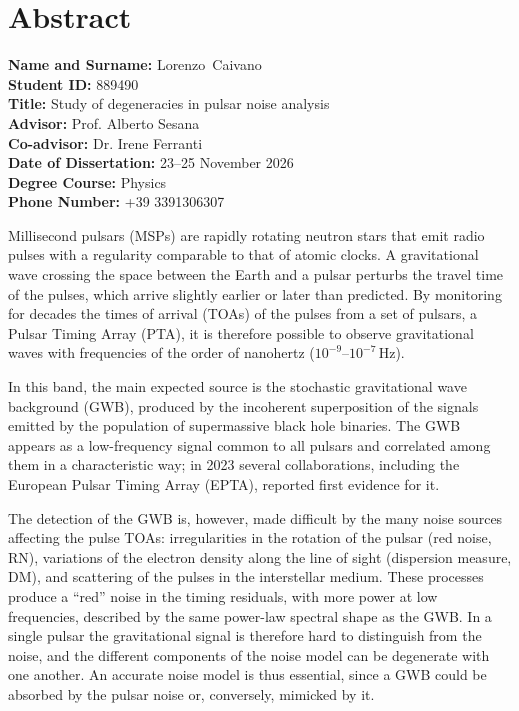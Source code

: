 \documentclass[12pt]{report}
\newcommand{\surnameEN}{Caivano}
\newcommand{\nameEN}{Lorenzo}
\newcommand{\matricolaEN}{889490}
\newcommand{\thesisTitleEN}{Study of degeneracies in pulsar noise analysis}
\newcommand{\advisorEN}{Prof. Alberto Sesana}
\newcommand{\coadvisorEN}{Dr. Irene Ferranti}
\newcommand{\defenseDateEN}{23--25 November 2026}
\newcommand{\degreeCourseEN}{Physics}
\newcommand{\phoneEN}{+39 3391306307}
\begin{document}
\newpage
\chapter*{Abstract}
\begin{center}
\textbf{Name and Surname:} \nameEN \, \surnameEN \\[0.3cm]
\textbf{Student ID:} \matricolaEN \\[0.3cm]
\textbf{Title:} \thesisTitleEN \\[0.3cm]
\textbf{Advisor:} \advisorEN \\[0.3cm]
\textbf{Co-advisor:} \coadvisorEN \\[0.3cm]
\textbf{Date of Dissertation:} \defenseDateEN \\[0.3cm]
\textbf{Degree Course:} \degreeCourseEN \\[0.3cm]
\textbf{Phone Number:} \phoneEN \\
\vspace{1cm}
\end{center}
\sloppy

\noindent
Millisecond pulsars (MSPs) are rapidly rotating neutron stars that emit radio
pulses with a regularity comparable to that of atomic clocks. A gravitational
wave crossing the space between the Earth and a pulsar perturbs the travel time
of the pulses, which arrive slightly earlier or later than predicted. By
monitoring for decades the times of arrival (TOAs) of the pulses from a set of
pulsars, a Pulsar Timing Array (PTA), it is therefore possible to observe
gravitational waves with frequencies of the order of nanohertz
($10^{-9}$--$10^{-7}$\,Hz). \par

In this band, the main expected source is the stochastic gravitational wave
background (GWB), produced by the incoherent superposition of the signals
emitted by the population of supermassive black hole binaries. The GWB appears
as a low-frequency signal common to all pulsars and correlated among them in a
characteristic way; in 2023 several collaborations, including the European
Pulsar Timing Array (EPTA), reported first evidence for it. \par

The detection of the GWB is, however, made difficult by the many noise sources
affecting the pulse TOAs: irregularities in the rotation of the pulsar (red
noise, RN), variations of the electron density along the line of sight
(dispersion measure, DM), and scattering of the pulses in the interstellar
medium. These processes produce a ``red'' noise in the timing residuals, with
more power at low frequencies, described by the same power-law spectral shape as
the GWB. In a single pulsar the gravitational signal is therefore hard to
distinguish from the noise, and the different components of the noise model can
be degenerate with one another. An accurate noise model is thus essential, since
a GWB could be absorbed by the pulsar noise or, conversely, mimicked by it. \par
\end{document}
